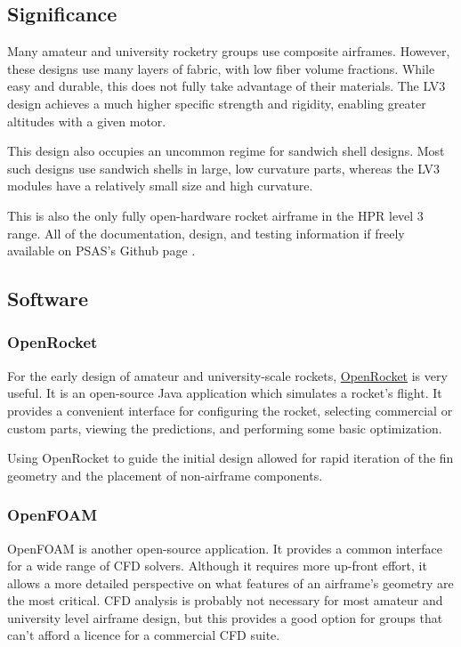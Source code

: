 \documentclass{aiaa-tc}%
\begin{document}
\subsection{Significance}
Many amateur and university rocketry groups use composite airframes. However, these designs use many layers of fabric, with low fiber volume fractions.
While easy and durable, this does not fully take advantage of their materials. The LV3 design achieves a much higher specific strength and rigidity, enabling greater altitudes with a given motor. 

This design also occupies an uncommon regime for sandwich shell designs. Most such designs use sandwich shells in large, low curvature parts, whereas the LV3 modules have a relatively small size and high curvature.

This is also the only fully open-hardware rocket airframe in the HPR level 3 range. All of the documentation, design, and testing information if freely available on PSAS's Github page \cite{LV3repo}.

\subsection{Software}
\subsubsection{OpenRocket}
For the early design of amateur and university-scale rockets, \href{http://openrocket.sourceforge.net/}{OpenRocket} is very useful. 
It is an open-source Java application which simulates a rocket's flight. It provides a convenient interface for configuring the rocket, selecting commercial or custom parts, viewing the predictions, and performing some basic optimization. 

Using OpenRocket to guide the initial design allowed for rapid iteration of the fin geometry and the placement of non-airframe components. 

\subsubsection{OpenFOAM}
OpenFOAM is another open-source application. It provides a common interface for a wide range of CFD solvers.
Although it requires more up-front effort, it allows a more detailed perspective on what features of an airframe's geometry are the most critical. 
CFD analysis is probably not necessary for most amateur and university level airframe design, but this provides a good option for groups that can't afford a licence for a commercial CFD suite. 
\end{document}
